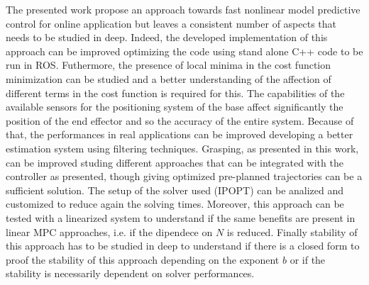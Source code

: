 The presented work propose an approach towards fast nonlinear model predictive control for online application but leaves a consistent number of aspects that needs to be studied in deep. 
Indeed, the developed implementation of this approach can be improved optimizing the code using stand alone C++ code to be run in ROS. Futhermore, the presence of local minima in the cost function minimization can be studied and a better understanding of the affection of different terms in the cost function is required for this. The capabilities of the available sensors for the positioning system of the base affect significantly the position of the end effector and so the accuracy of the entire system. Because of that, the performances in real applications can be improved developing a better estimation system using filtering techniques. Grasping, as presented in this work, can be improved studing different approaches that can be integrated with the controller as presented, though giving optimized pre-planned trajectories can be a sufficient solution. The setup of the solver used (IPOPT) can be analized and customized to reduce again the solving times. Moreover, this approach can be tested with a linearized system to understand if the same benefits are present in linear MPC approaches, i.e. if the dipendece on $N$ is reduced. Finally stability of this approach has to be studied in deep to understand if there is a closed form to proof the stability of this approach depending on the exponent $b$ or if the stability is necessarily dependent on solver performances.


